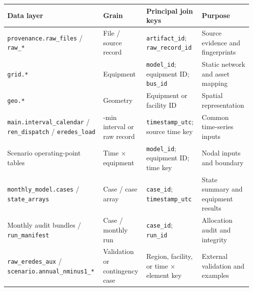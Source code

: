 \documentclass[
  10pt]{article}
\begin{document}
\begin{longtable}[]{@{}
  >{\raggedright\arraybackslash}p{}
  >{\raggedright\arraybackslash}p{}
  >{\raggedright\arraybackslash}p{}
  >{\raggedright\arraybackslash}p{}@{}}
\toprule\noalign{}
\begin{minipage}[b]{\linewidth}\raggedright
Data layer
\end{minipage} & \begin{minipage}[b]{\linewidth}\raggedright
Grain
\end{minipage} & \begin{minipage}[b]{\linewidth}\raggedright
Principal join keys
\end{minipage} & \begin{minipage}[b]{\linewidth}\raggedright
Purpose
\end{minipage} \\
\midrule\noalign{}
\endhead
\bottomrule\noalign{}
\endlastfoot
\texttt{provenance.raw\_files} / \texttt{raw\_*} & File / source record
& \texttt{artifact\_id}; \texttt{raw\_record\_id} & Source evidence and
fingerprints \\
\texttt{grid.*} & Equipment & \texttt{model\_id}; equipment ID;
\texttt{bus\_id} & Static network and asset mapping \\
\texttt{geo.*} & Geometry & Equipment or facility ID & Spatial
representation \\
\texttt{main.interval\_calendar} / \texttt{ren\_dispatch} /
\texttt{eredes\_load} & 15-min interval or raw record &
\texttt{timestamp\_utc}; source time key & Common time-series inputs \\
Scenario operating-point tables & Time × equipment & \texttt{model\_id};
equipment ID; time key & Nodal inputs and boundary \\
\texttt{monthly\_model.cases} / \texttt{state\_arrays} & Case / case
array & \texttt{case\_id}; \texttt{timestamp\_utc} & State summary and
equipment results \\
Monthly audit bundles / \texttt{run\_manifest} & Case / monthly run &
\texttt{case\_id}; \texttt{run\_id} & Allocation audit and integrity \\
\texttt{raw\_eredes\_aux} / \texttt{scenario.annual\_nminus1\_*} &
Validation or contingency case & Region, facility, or time × element key
& External validation and examples \\
\end{longtable}
\end{document}
